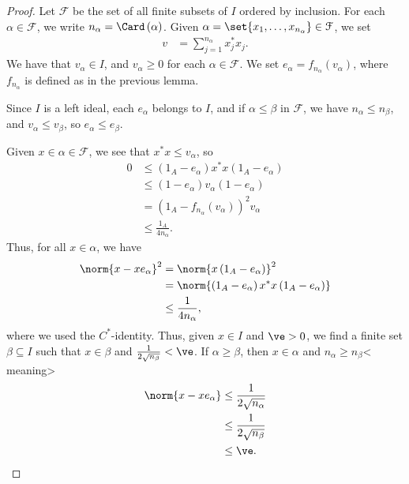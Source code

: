 \documentclass[10pt]{mypackage}
\begin{document}
\begin{proof}
  Let $\mathcal{F}$ be the set of all finite subsets of $I$ ordered by inclusion. For each $\alpha \in \mathcal{F}$, we write $n_{\alpha} = \Card\left(\alpha\right)$. Given $\alpha = \set{x_1,\dots,x_{n_{\alpha}}}\in \mathcal{F}$, we set
  \begin{align*}
    v &= \sum_{j=1}^{n_{\alpha}}x_j^{\ast}x_j.
  \end{align*}
  We have that $v_{\alpha}\in I$, and $v_{\alpha}\geq 0$ for each $\alpha\in \mathcal{F}$. We set $e_{\alpha} = f_{n_{\alpha}}\left(v_{\alpha}\right)$, where $f_{n_{\alpha}}$ is defined as in the previous lemma.\newline

  Since $I$ is a left ideal, each $e_{\alpha}$ belongs to $I$, and if $\alpha \leq \beta$ in $\mathcal{F}$, we have $n_{\alpha}\leq n_{\beta}$, and $v_{\alpha}\leq v_{\beta}$, so $e_{\alpha}\leq e_{\beta}$.\newline

  Given $x\in \alpha\in \mathcal{F}$, we see that $x^{\ast}x \leq v_{\alpha}$, so
  \begin{align*}
    0 &\leq \left(1_{A}-e_{\alpha}\right)x^{\ast}x\left(1_A - e_{\alpha}\right)\\
      &\leq \left(1-e_{\alpha}\right)v_{\alpha}\left(1-e_{\alpha}\right)\\
      &= \left(1_A - f_{n_{\alpha}}\left(v_{\alpha}\right)\right)^2v_{\alpha}\\
      &\leq \frac{1_A}{4n_{\alpha}}.
  \end{align*}
  Thus, for all $x\in\alpha$, we have
  \begin{align*}
    \norm{x-xe_{\alpha}}^2 &= \norm{x\left(1_A-e_{\alpha}\right)}^2\\
                           &= \norm{\left(1_A-e_{\alpha}\right)x^{\ast}x\left(1_A - e_{\alpha}\right)}\\
                           &\leq \frac{1}{4n_{\alpha}},
  \end{align*}
  where we used the $C^{\ast}$-identity. Thus, given $x\in I$ and $\ve > 0$, we find a finite set $\beta\subseteq I$ such that $x\in\beta$ and $\frac{1}{2\sqrt{n_{\beta}}} < \ve$. If $\alpha\geq \beta$, then $x\in\alpha$ and $n_{\alpha}\geq n_{\beta}$< meaning>
  \begin{align*}
    \norm{x-xe_{\alpha}} &\leq \frac{1}{2\sqrt{n_{\alpha}}}\\
                         &\leq \frac{1}{2\sqrt{n_{\beta}}}\\
                         &\leq \ve.
  \end{align*}
\end{proof}
\end{document}
